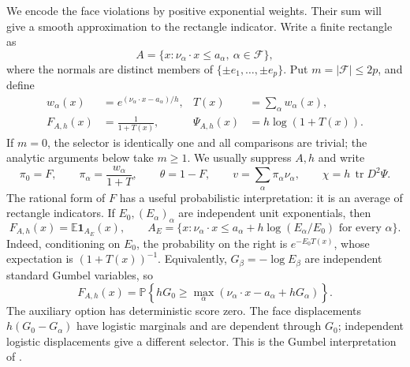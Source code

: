 \documentclass[11pt,letterpaper]{article}
\theoremstyle{remark}
\newcommand{\E}{\mathbb E}
\newcommand{\Pp}{\mathbb P}
\newcommand{\cF}{\mathcal F}
\newcommand{\tr}{\operatorname{tr}}
\newcommand{\ind}{\mathbf 1}
\begin{document}
We encode the face violations by positive exponential weights.  Their
sum will give a smooth approximation to the rectangle indicator.  Write
a finite rectangle as
\[
 A=\{x:\nu_\alpha\cdot x\le a_\alpha,\ \alpha\in\cF\},
\]
where the normals are distinct members of
\(\{\pm e_1,\ldots,\pm e_p\}\). Put \(m=|\cF|\le2p\), and define
\begin{equation}
 \begin{aligned}
 w_\alpha(x)&=e^{(\nu_\alpha\cdot x-a_\alpha)/h},
 &T(x)&=\sum_\alpha w_\alpha(x),\\
 F_{A,h}(x)&=\frac1{1+T(x)},
 &\Psi_{A,h}(x)&=h\log(1+T(x)).
 \end{aligned}
 \label{appx-eq:selector}
\end{equation}
If \(m=0\), the selector is identically one and all comparisons are
trivial; the analytic arguments below take \(m\ge1\).
We usually suppress \(A,h\) and write
\[
 \pi_0=F,\qquad \pi_\alpha=\frac{w_\alpha}{1+T},
 \qquad \theta=1-F,\qquad v=\sum_\alpha\pi_\alpha\nu_\alpha,
 \qquad \chi=h\,\tr D^2\Psi.
\]
The rational form of \(F\) has a useful probabilistic interpretation:
it is an average of rectangle indicators.  If
\(E_0,(E_\alpha)_\alpha\) are independent unit exponentials, then
\begin{equation}
 F_{A,h}(x)=\E\ind_{A_E}(x),\qquad
 A_E=\{x:\nu_\alpha\cdot x\le
 a_\alpha+h\log(E_\alpha/E_0)\text{ for every }\alpha\}.
 \label{appx-eq:exp-mixture}
\end{equation}
Indeed, conditioning on \(E_0\), the probability on the right is
\(e^{-E_0T(x)}\), whose expectation is \((1+T(x))^{-1}\).
Equivalently, \(G_\beta=-\log E_\beta\) are independent standard
Gumbel variables, so
\[
 F_{A,h}(x)=\Pp\!\left\{hG_0\ge
 \max_\alpha(\nu_\alpha\cdot x-a_\alpha+hG_\alpha)\right\}.
\]
The auxiliary option has deterministic score zero. The face displacements
\(h(G_0-G_\alpha)\) have logistic marginals and are dependent through
\(G_0\); independent logistic displacements give a different selector.
This is the Gumbel interpretation of \cite{Gumbel}.
\end{document}
